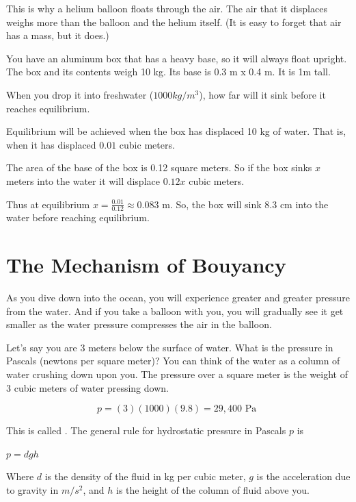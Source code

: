 This is why a helium balloon floats through the air. The air
that it displaces weighs more than the balloon and the helium itself. (It is easy to forget that air has a mass, but it does.)

\begin{Exercise}[title={Bouyancy}, label=bouyancy]
  You have an aluminum box that has a heavy base, so it will always
  float upright. The box and its contents weigh 10 kg. Its base is 0.3 m x 0.4 m. It is 1m tall.

  When you drop it into freshwater ($1000 kg/m^3$), how far will it sink
  before it reaches equilibrium.
  
\end{Exercise}
\begin{Answer}[ref=bouyancy]
  Equilibrium will be achieved when the box has displaced 10 kg of water. That is, when it has displaced $0.01$ cubic meters.

  The area of the base of the box is 0.12 square meters.  So if the
  box sinks $x$ meters into the water it will displace $0.12 x$ cubic
  meters.

  Thus at equilibrium $x = \frac{0.01}{0.12} \approx 0.083$ m.  So,
  the box will sink 8.3 cm into the water before reaching equilibrium.
\end{Answer}

\section{The Mechanism of Bouyancy}

As you dive down into the ocean, you will experience greater and
greater pressure from the water. And if you take a balloon with you, you
will gradually see it get smaller as the water pressure compresses the
air in the balloon.

Let's say you are 3 meters below the surface of water. What is the
pressure in Pascals (newtons per square meter)? You can think of the
water as a column of water crushing down upon you. The pressure over
a square meter is the weight of 3 cubic meters of water pressing down.

$$p = (3)(1000)(9.8) = 29,400 \text{ Pa }$$

This is called . The general rule for
hydrostatic pressure in Pascals $p$ is

$p = d g h$

Where  $d$ is the density of the fluid
in kg per cubic meter, $g$ is the acceleration due to gravity in
$m/s^2$, and $h$ is the height of the column of fluid above you.

